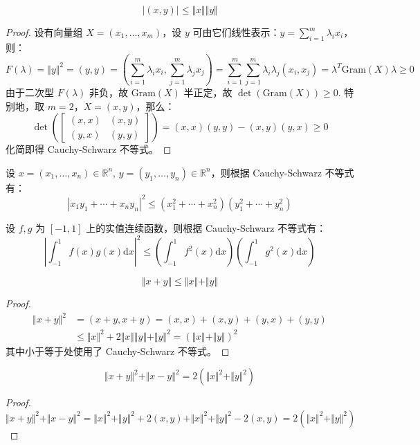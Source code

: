\begin{theorem}
\label{thm:cauchy-schwarz}
\[
    |(x,y)|\leq \Vert x\Vert\Vert y\Vert
\]
\end{theorem}
\begin{proof}
设有向量组 $X=(x_1,\ldots,x_m)$，设 $y$ 可由它们线性表示：$y=\sum_{i=1}^m\lambda_ix_i$，则：
\[
    F(\lambda)=\Vert y\Vert^2=(y,y)=\left(\sum_{i=1}^m\lambda_ix_i,\sum_{j=1}^m\lambda_jx_j\right)=\sum_{i=1}^m\sum_{j=1}^m\lambda_i\lambda_j(x_i,x_j)=\lambda^T \text{Gram}(X)\lambda\geq0
\]
由于二次型 $F(\lambda)$ 非负，故 $\text{Gram}(X)$ 半正定，故 $\det(\text{Gram}(X))\geq 0$.
特别地，取 $m=2$，$X=(x,y)$，那么：
\[
    \det\left(\begin{bmatrix}(x,x)&(x,y)\\(y,x)&(y,y)\end{bmatrix}\right)=(x,x)(y,y)-(x,y)(y,x)\geq 0
\]
化简即得 Cauchy-Schwarz 不等式。
\end{proof}
\begin{example}
设 $x=(x_1,\ldots,x_n)\in\mathbb R^n,\,y=(y_1,\ldots,y_n)\in\mathbb R^n$，则根据 Cauchy-Schwarz 不等式有：
\[
    |x_1y_1+\cdots+x_ny_n|^2\leq (x_1^2+\cdots+x_n^2)(y_1^2+\cdots+y_n^2)
\]
\end{example}
\begin{example}
设 $f,g$ 为 $[-1,1]$ 上的实值连续函数，则根据 Cauchy-Schwarz 不等式有：
\[
    \left|\int_{-1}^1f(x)g(x)\mathrm dx\right|^2\leq \left(\int_{-1}^1f^2(x)\mathrm dx\right)\left(\int_{-1}^1g^2(x)\mathrm dx\right)
\]
\end{example}

\begin{theorem}[三角不等式]
\label{thm:triangle}
\[
    \Vert x+y\Vert\leq \Vert x\Vert+\Vert y\Vert
\]
\end{theorem}
\begin{proof}
\begin{align*}
    \Vert x+y\Vert^2&=(x+y,x+y)=(x,x)+(x,y)+(y,x)+(y,y)\\
    &\leq\Vert x\Vert^2+2\Vert x\Vert\Vert y\Vert+\Vert y\Vert^2=(\Vert x\Vert+\Vert y\Vert)^2
\end{align*}
其中小于等于处使用了 Cauchy-Schwarz 不等式。
\end{proof}

\begin{theorem}[平行四边形恒等式]
\label{thm:parallelogram}
\[
    \Vert x+y\Vert^2+\Vert x-y\Vert^2=2(\Vert x\Vert^2+\Vert y\Vert^2)
\]
\end{theorem}
\begin{proof}
\[
    \Vert x+y\Vert^2+\Vert x-y\Vert^2=\Vert x\Vert^2+\Vert y\Vert^2+2(x,y)+\Vert x\Vert^2+\Vert y\Vert^2-2(x,y)=2(\Vert x\Vert^2+\Vert y\Vert ^2)
\]
\end{proof}

